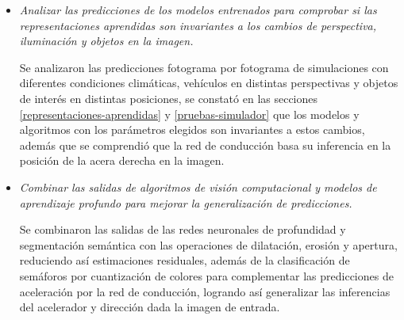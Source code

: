 \begin{itemize}
	\item \textit{Analizar las predicciones de los modelos entrenados para comprobar si las representaciones aprendidas son invariantes a los cambios de perspectiva, iluminación y objetos en la imagen.}
	
	
	Se analizaron las predicciones fotograma por fotograma de simulaciones con diferentes condiciones climáticas, vehículos en distintas perspectivas y objetos de interés en distintas posiciones, se constató en las secciones \ref{representaciones-aprendidas} y \ref{pruebas-simulador} que los modelos y algoritmos con los parámetros elegidos son invariantes a estos cambios, además que se comprendió que la red de conducción basa su inferencia en la posición de la acera derecha en la imagen.
	
	\item \textit{Combinar las salidas de algoritmos de visión computacional y modelos de aprendizaje profundo para mejorar la generalización de predicciones.}
	
	
	Se combinaron las salidas de las redes neuronales de profundidad y segmentación semántica con las operaciones de dilatación, erosión y apertura, reduciendo así estimaciones residuales, además de la clasificación de semáforos por cuantización de colores para complementar las predicciones de aceleración por la red de conducción, logrando así generalizar las inferencias del acelerador y dirección dada la imagen de entrada.
	

\end{itemize}
